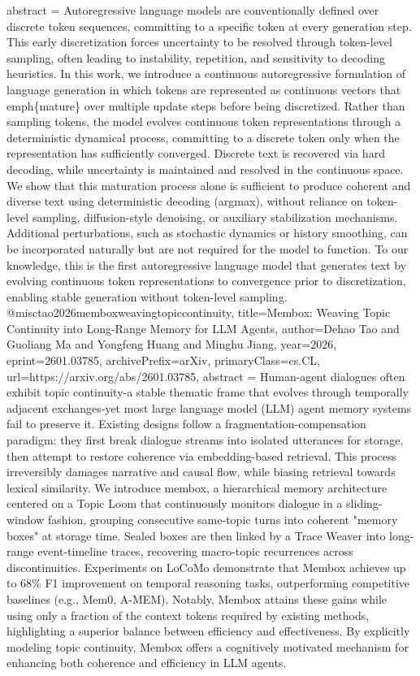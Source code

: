 {      abstract = {Autoregressive language models are conventionally defined over discrete token sequences, committing to a specific token at every generation step. This early discretization forces uncertainty to be resolved through token-level sampling, often leading to instability, repetition, and sensitivity to decoding heuristics.   In this work, we introduce a continuous autoregressive formulation of language generation in which tokens are represented as continuous vectors that \\emph\{mature\} over multiple update steps before being discretized. Rather than sampling tokens, the model evolves continuous token representations through a deterministic dynamical process, committing to a discrete token only when the representation has sufficiently converged. Discrete text is recovered via hard decoding, while uncertainty is maintained and resolved in the continuous space.   We show that this maturation process alone is sufficient to produce coherent and diverse text using deterministic decoding (argmax), without reliance on token-level sampling, diffusion-style denoising, or auxiliary stabilization mechanisms. Additional perturbations, such as stochastic dynamics or history smoothing, can be incorporated naturally but are not required for the model to function.   To our knowledge, this is the first autoregressive language model that generates text by evolving continuous token representations to convergence prior to discretization, enabling stable generation without token-level sampling.}
}@misc{tao2026memboxweavingtopiccontinuity,
      title={Membox: Weaving Topic Continuity into Long-Range Memory for LLM Agents}, 
      author={Dehao Tao and Guoliang Ma and Yongfeng Huang and Minghu Jiang},
      year={2026},
      eprint={2601.03785},
      archivePrefix={arXiv},
      primaryClass={cs.CL},
      url={https://arxiv.org/abs/2601.03785},
      abstract = {Human-agent dialogues often exhibit topic continuity-a stable thematic frame that evolves through temporally adjacent exchanges-yet most large language model (LLM) agent memory systems fail to preserve it. Existing designs follow a fragmentation-compensation paradigm: they first break dialogue streams into isolated utterances for storage, then attempt to restore coherence via embedding-based retrieval. This process irreversibly damages narrative and causal flow, while biasing retrieval towards lexical similarity. We introduce membox, a hierarchical memory architecture centered on a Topic Loom that continuously monitors dialogue in a sliding-window fashion, grouping consecutive same-topic turns into coherent "memory boxes" at storage time. Sealed boxes are then linked by a Trace Weaver into long-range event-timeline traces, recovering macro-topic recurrences across discontinuities. Experiments on LoCoMo demonstrate that Membox achieves up to 68\% F1 improvement on temporal reasoning tasks, outperforming competitive baselines (e.g., Mem0, A-MEM). Notably, Membox attains these gains while using only a fraction of the context tokens required by existing methods, highlighting a superior balance between efficiency and effectiveness. By explicitly modeling topic continuity, Membox offers a cognitively motivated mechanism for enhancing both coherence and efficiency in LLM agents.}
}
